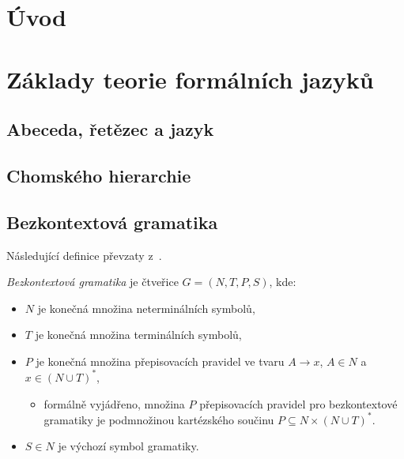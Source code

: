 
%

\chapter{Úvod}\label{kap_uvod}


\chapter{Základy teorie formálních jazyků}\label{kap_teorie}

\section{Abeceda, řetězec a jazyk}
\section{Chomského hierarchie}
\section{Bezkontextová gramatika}\label{kap_bkg}
Následující definice převzaty z~\cite{TIN-opora}.
\begin{definition}\label{def_bkg}
    \emph{Bezkontextová gramatika} je čtveřice $G = (N, T, P, S)$, kde:
    \begin{itemize}
        \item $N$ je konečná množina neterminálních symbolů,
        \item $T$ je konečná množina terminálních symbolů,
        \item $P$ je konečná množina přepisovacích pravidel ve tvaru $A \rightarrow x$, $A \in N$ a $x \in (N \cup T)^*$,
        \begin{itemize}[label=$\circ$]
            \item formálně vyjádřeno, množina $P$ přepisovacích pravidel pro bezkontextové gramatiky je podmnožinou kartézského součinu $P \subseteq  N \times (N \cup T)^*$. 
        \end{itemize}
        \item $S \in N$ je výchozí symbol gramatiky.
    \end{itemize}
\end{definition}

